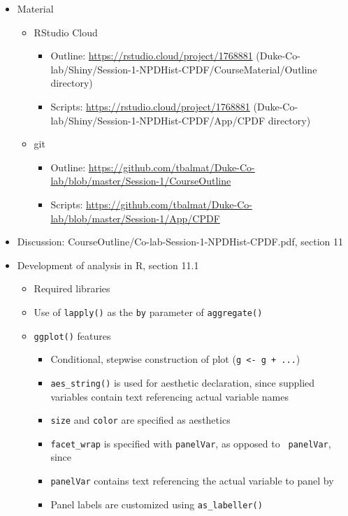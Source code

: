 \documentclass[10pt, letterpaper]{article}
\begin{document}
\begin{spacing}{1.0}
\begin{itemize}
  \item Material
  \begin{itemize}
      \item RStudio Cloud
      \begin{itemize}
          \item Outline: \url{https://rstudio.cloud/project/1768881} (Duke-Co-lab/Shiny/Session-1-NPDHist-CPDF/CourseMaterial/Outline directory)
          \item Scripts: \url{https://rstudio.cloud/project/1768881} (Duke-Co-lab/Shiny/Session-1-NPDHist-CPDF/App/CPDF directory)
      \end{itemize}
      \item git
      \begin{itemize}
        \item Outline: \url{https://github.com/tbalmat/Duke-Co-lab/blob/master/Session-1/CourseOutline}
        \item Scripts: \url{https://github.com/tbalmat/Duke-Co-lab/blob/master/Session-1/App/CPDF}
      \end{itemize}
  \end{itemize}
  \item Discussion:  CourseOutline/Co-lab-Session-1-NPDHist-CPDF.pdf, section 11 
  \item Development of analysis in R, section 11.1
    \begin{itemize}
      \item Required libraries
      \item Use of \texttt{lapply()} as the \texttt{by} parameter of \texttt{aggregate()}
      \item \texttt{ggplot()} features
        \begin{itemize}
          \item Conditional, stepwise construction of plot (\texttt{g <- g + ...})
          \item \texttt{aes\_string()} is used for aesthetic declaration, since supplied variables contain text referencing actual variable names
          \item \texttt{size} and \texttt{color} are specified as aesthetics
          \item \texttt{facet\_wrap} is specified with \texttt{panelVar}, as opposed to \texttt{~panelVar}, since \item \texttt{panelVar} contains text referencing the actual variable to panel by
          \item Panel labels are customized using \texttt{as\_labeller()}

\end{itemize}
\end{itemize}
\end{itemize}
\end{spacing}
\end{document}
